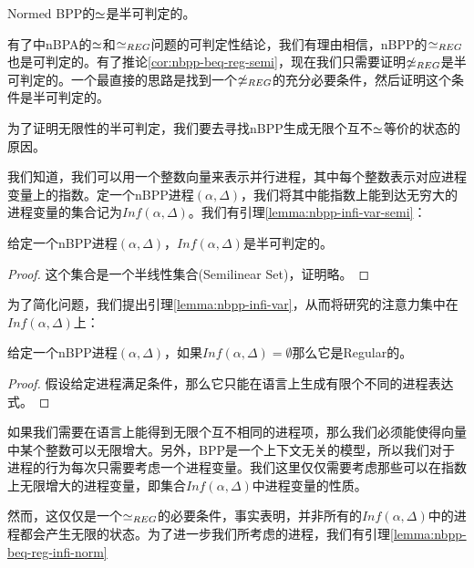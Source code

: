 \begin{cor}\label{cor:nbpp-beq-reg-semi}
Normed BPP的$\simeq$是半可判定的。
\end{cor}

有了\cite{Fu2013}中nBPA的$\simeq$和$\simeq_{REG}$问题的可判定性结论，我们有理由相信，nBPP的$\simeq_{REG}$也是可判定的。有了推论\ref{cor:nbpp-beq-reg-semi}，现在我们只需要证明$\not\simeq_{REG}$是半可判定的。一个最直接的思路是找到一个$\not\simeq_{REG}$的充分必要条件，然后证明这个条件是半可判定的。

为了证明无限性的半可判定，我们要去寻找nBPP生成无限个互不$\simeq$等价的状态的原因。

我们知道，我们可以用一个整数向量来表示并行进程，其中每个整数表示对应进程变量上的指数。定一个nBPP进程$(\alpha,\Delta)$，我们将其中能指数上能到达无穷大的进程变量的集合记为$Inf(\alpha,\Delta)$。我们有引理\ref{lemma:nbpp-infi-var-semi}：

\begin{lem}\label{lemma:nbpp-infi-var-semi}
给定一个nBPP进程$(\alpha,\Delta)$，$Inf(\alpha,\Delta)$是半可判定的。
\end{lem}

\begin{proof}
这个集合是一个半线性集合(Semilinear Set)，证明略。
\end{proof}

为了简化问题，我们提出引理\ref{lemma:nbpp-infi-var}，从而将研究的注意力集中在$Inf(\alpha,\Delta)$上：

\begin{lem}\label{lemma:nbpp-infi-var}
给定一个nBPP进程$(\alpha,\Delta)$，如果$Inf(\alpha,\Delta)=\emptyset$那么它是Regular的。
\end{lem}

\begin{proof}
假设给定进程满足条件，那么它只能在语言上生成有限个不同的进程表达式。
\end{proof}

如果我们需要在语言上能得到无限个互不相同的进程项，那么我们必须能使得向量中某个整数可以无限增大。另外，BPP是一个上下文无关的模型，所以我们对于进程的行为每次只需要考虑一个进程变量。我们这里仅仅需要考虑那些可以在指数上无限增大的进程变量，即集合$Inf(\alpha,\Delta)$中进程变量的性质。

然而，这仅仅是一个$\simeq_{REG}$的必要条件，事实表明，并非所有的$Inf(\alpha,\Delta)$中的进程都会产生无限的状态。为了进一步我们所考虑的进程，我们有引理\ref{lemma:nbpp-beq-reg-infi-norm}

